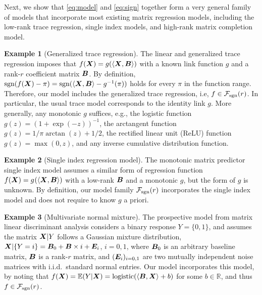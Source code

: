 \documentclass[aos]{imsart}
\theoremstyle{definition}
\newtheorem{example}{Example}
\def\sign{\textup{sgn}}
\def\caliF{\tF_{\textup{sgn}}}
\begin{document}
Next, we show that \eqref{eq:model} and \eqref{eq:sign} together form a very general family of models that incorporate most existing matrix regression models, including the low-rank trace regression, single index models, and high-rank matrix completion model. 

\begin{example}[Generalized trace regression] The linear and generalized trace regression \cite{zhou2014regularized, wang2017generalized, fan2019generalized} imposes that $f(\bm X)=g(\langle \bm X, \bm B \rangle)$ with a known link function $g$ and a rank-$r$ coefficient matrix $\bm B$. By definition, $\sign(f(\mX)-\pi)=\sign(\langle \mX, \mB \rangle -g^{-1}(\pi))$ holds for every $\pi$ in the function range. Therefore, our model includes the generalized trace regression, i.e, $f \in \caliF(r)$. In particular, the usual trace model corresponds to the identity link $g$. More generally, any monotonic $g$ suffices, e.g., the logistic function $g(z)=(1+\exp(-z))^{-1}$, the arctangent function $g(z)={1/\pi}\arctan(z)+{1/2}$, the rectified linear unit (ReLU) function $g(z)=\max(0,z)$, and any inverse cumulative distribution function. %
\end{example}

\begin{example}[Single index regression model] 
The monotonic matrix predictor single index model \citep{balabdaoui2019least,ganti2017learning} assumes a similar form of regression function $f(\bm X)=g^{}(\langle \bm X, \bm B\rangle)$ with a low-rank $\bm B$ and a monotonic $g$, but the form of $g$ is unknown. By definition, our model family $\caliF(r)$ incorporates the single index model and does not require to know $g$ a priori. 
\end{example}

\begin{example}[Multivariate normal mixture]
The prospective model from matrix linear discriminant analysis \citep{hu2020matrix} considers a binary response $Y=\{0,1\}$, and assumes the matrix $\bm X|Y$ follows a Gaussian mixture distribution, $\bm X|\{Y=i\} = \bm B_0 + \bm B\times i + \bm{E}_i$, $i=0,1$, where $\bm B_0$ is an arbitrary baseline matrix, $\bm B$ is a rank-$r$ matrix, and $(\bm{E}_i)_{i=0,1}$ are two mutually independent noise matrices with i.i.d.\ standard normal entries. Our model incorporates this model, by noting that $f(\bm X)=\mathbb{E}(Y|\bm X)=\text{logistic}(\langle \bm B, \bm X \rangle+b)$ for some $b\in\mathbb{R}$, and thus $f\in \caliF(r)$. 
\end{example}
\end{document}
